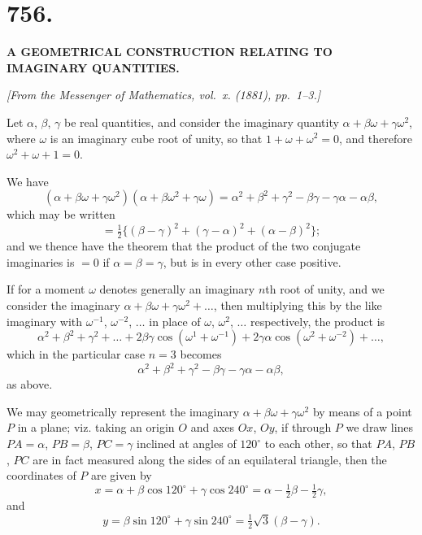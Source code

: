 \documentclass[11pt,a4paper]{book}
\begin{document}
\newpage


\section*{756.}

\begin{center}
\textbf{A GEOMETRICAL CONSTRUCTION RELATING TO IMAGINARY QUANTITIES.}
\end{center}

\begin{flushright}
\textit{[From the Messenger of Mathematics, vol.~x. (1881), pp.~1--3.]}
\end{flushright}

Let $\alpha$, $\beta$, $\gamma$ be real quantities, and consider the imaginary quantity
$\alpha + \beta\omega + \gamma\omega^2$, where $\omega$ is an imaginary cube root of unity, so that
$1 + \omega + \omega^2 = 0$, and therefore $\omega^2 + \omega + 1 = 0$.

We have
%
\[
(\alpha + \beta\omega + \gamma\omega^2)
(\alpha + \beta\omega^2 + \gamma\omega)
= \alpha^2 + \beta^2 + \gamma^2 - \beta\gamma - \gamma\alpha - \alpha\beta,
\]
%
which may be written
%
\[
= \tfrac{1}{2} \{ (\beta-\gamma)^2 + (\gamma-\alpha)^2 + (\alpha-\beta)^2 \};
\]
%
and we thence have the theorem that the product of the two conjugate
imaginaries is $=0$ if $\alpha = \beta = \gamma$, but is in every other case positive.

If for a moment $\omega$ denotes generally an imaginary $n$th root of unity, and
we consider the imaginary $\alpha + \beta\omega + \gamma\omega^2 + \ldots$, then multiplying this by
the like imaginary with $\omega^{-1}$, $\omega^{-2}$, $\ldots$ in place of $\omega$, $\omega^2$, $\ldots$ respectively,
the product is
%
\[
\alpha^2 + \beta^2 + \gamma^2 + \ldots
+ 2\beta\gamma \cos(\omega^1 + \omega^{-1})
+ 2\gamma\alpha \cos(\omega^2 + \omega^{-2})
+ \ldots,
\]
%
which in the particular case $n=3$ becomes
%
\[
\alpha^2 + \beta^2 + \gamma^2 - \beta\gamma - \gamma\alpha - \alpha\beta,
\]
%
as above.

We may geometrically represent the imaginary $\alpha + \beta\omega + \gamma\omega^2$
by means of a point $P$ in a plane; viz. taking an origin $O$ and
axes $Ox$, $Oy$, if through $P$ we draw lines $PA = \alpha$, $PB = \beta$, $PC = \gamma$
inclined at angles of $120^{\circ}$ to each other, so that $PA$, $PB$, $PC$ are in fact
measured along the sides of an equilateral triangle, then the coordinates of $P$
are given by
%
\[
x = \alpha + \beta\cos 120^{\circ} + \gamma\cos 240^{\circ}
= \alpha - \tfrac{1}{2}\beta - \tfrac{1}{2}\gamma,
\]
and
%
\[
y = \beta\sin 120^{\circ} + \gamma\sin 240^{\circ}
= \tfrac{1}{2}\sqrt{3}(\beta - \gamma).
\]
\end{document}
